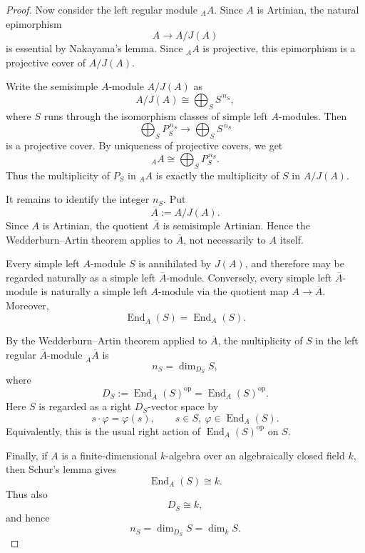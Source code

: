 \begin{proof}
    Now consider the left regular module ${}_A A$. Since $A$ is Artinian, the natural
    epimorphism
    \[
        A\longrightarrow A/J(A)
    \]
    is essential by Nakayama's lemma. Since ${}_A A$ is projective, this epimorphism is
    a projective cover of $A/J(A)$.

    Write the semisimple $A$-module $A/J(A)$ as
    \[
        A/J(A)\cong \bigoplus_S S^{\,n_S},
    \]
    where $S$ runs through the isomorphism classes of simple left $A$-modules. Then
    \[
        \bigoplus_S P_S^{\,n_S}
        \longrightarrow
        \bigoplus_S S^{\,n_S}
    \]
    is a projective cover. By uniqueness of projective covers, we get
    \[
        {}_A A\cong \bigoplus_S P_S^{\,n_S}.
    \]
    Thus the multiplicity of $P_S$ in ${}_A A$ is exactly the multiplicity of $S$ in
    $A/J(A)$.

    It remains to identify the integer \(n_S\). Put
    \[
        \overline{A}:=A/J(A).
    \]
    Since \(A\) is Artinian, the quotient \(\overline{A}\) is semisimple Artinian. Hence the
    Wedderburn--Artin theorem applies to \(\overline{A}\), not necessarily to \(A\) itself.
    
    Every simple left \(A\)-module \(S\) is annihilated by \(J(A)\), and therefore may be
    regarded naturally as a simple left \(\overline{A}\)-module. Conversely, every simple left
    \(\overline{A}\)-module is naturally a simple left \(A\)-module via the quotient map
    \(A\to \overline{A}\). Moreover,
    \[
        \operatorname{End}_{\overline{A}}(S)=\operatorname{End}_A(S).
    \]
    
    By the Wedderburn--Artin theorem applied to \(\overline{A}\), the multiplicity of \(S\)
    in the left regular \(\overline{A}\)-module \({}_{\overline{A}}\overline{A}\) is
    \[
        n_S=\dim_{D_S} S,
    \]
    where
    \[
        D_S:=\operatorname{End}_{\overline{A}}(S)^{\operatorname{op}}
                 =\operatorname{End}_A(S)^{\operatorname{op}}.
    \]
    Here \(S\) is regarded as a right \(D_S\)-vector space by
    \[
        s\cdot \varphi=\varphi(s),
        \qquad s\in S,\ \varphi\in \operatorname{End}_A(S).
    \]
    Equivalently, this is the usual right action of
    \(\operatorname{End}_A(S)^{\operatorname{op}}\) on \(S\).
    
    Finally, if \(A\) is a finite-dimensional \(k\)-algebra over an algebraically closed field
    \(k\), then Schur's lemma gives
    \[
        \operatorname{End}_A(S)\cong k.
    \]
    Thus also
    \[
        D_S\cong k,
    \]
    and hence
    \[
        n_S=\dim_{D_S}S=\dim_k S.
    \]
\end{proof}

